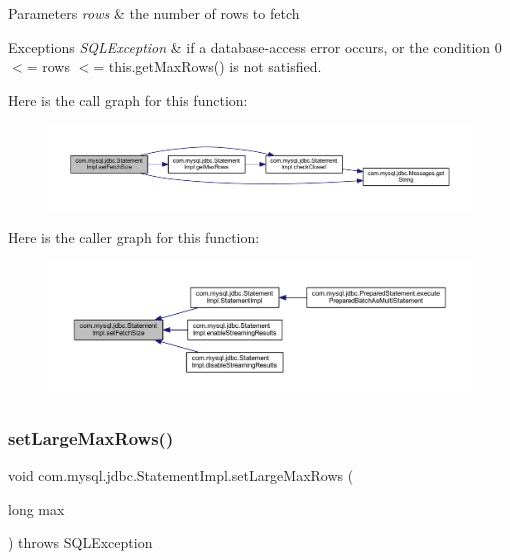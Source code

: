 \begin{DoxyParams}{Parameters}
{\em rows} & the number of rows to fetch\\
\hline
\end{DoxyParams}

\begin{DoxyExceptions}{Exceptions}
{\em S\+Q\+L\+Exception} & if a database-\/access error occurs, or the condition 0 $<$= rows $<$= this.\+get\+Max\+Rows() is not satisfied. \\
\hline
\end{DoxyExceptions}
Here is the call graph for this function\+:
\nopagebreak
\begin{figure}[H]
\begin{center}
\leavevmode
\includegraphics[width=350pt]{classcom_1_1mysql_1_1jdbc_1_1_statement_impl_a5e92dd77e4ff9bf65cff4f50e63a1045_cgraph}
\end{center}
\end{figure}
Here is the caller graph for this function\+:
\nopagebreak
\begin{figure}[H]
\begin{center}
\leavevmode
\includegraphics[width=350pt]{classcom_1_1mysql_1_1jdbc_1_1_statement_impl_a5e92dd77e4ff9bf65cff4f50e63a1045_icgraph}
\end{center}
\end{figure}
\mbox{\label{classcom_1_1mysql_1_1jdbc_1_1_statement_impl_a273589250c52af54dac911d1cfcfd87d}} 
\subsubsection{\texorpdfstring{set\+Large\+Max\+Rows()}{setLargeMaxRows()}}
{\footnotesize\ttfamily void com.\+mysql.\+jdbc.\+Statement\+Impl.\+set\+Large\+Max\+Rows (\begin{DoxyParamCaption}\item[{long}]{max }\end{DoxyParamCaption}) throws S\+Q\+L\+Exception}

